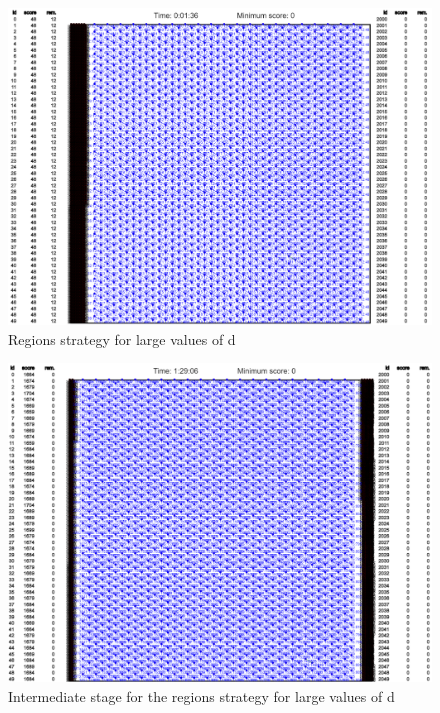 \documentclass[a4paper,11pt,titlepage]{article}
\begin{document}
\begin{figure} [h]
\centering
\includegraphics[width=\textwidth]{imgs/large_d_start}
\caption{Regions strategy for large values of d}
\label{large_d_start}
\end{figure}

\begin{figure} [h]
\centering
\includegraphics[width=\textwidth]{imgs/large_d_middle}
\caption{Intermediate stage for the regions strategy for large values of d}
\label{large_d_middle}
\end{figure}
\end{document}
